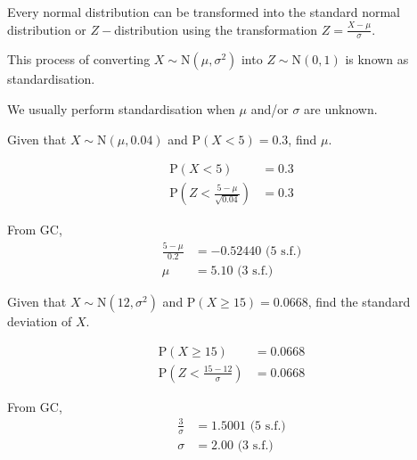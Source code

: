 \documentclass[11pt,a4paper]{book}
\begin{document}
Every normal distribution can be transformed into the standard normal
distribution or $Z-$distribution using the transformation ${\displaystyle Z=\frac{X-\mu}{\sigma}}$.

This process of converting $X\sim\text{N}\left(\mu,\sigma^{2}\right)$
into $Z\sim\text{N}\left(0,1\right)$ is known as standardisation.

We usually perform standardisation when $\mu$ and/or $\sigma$ are
unknown.

\begin{example}

Given that $X\sim\text{N}\left(\mu,0.04\right)$ and $\text{P}\left(X<5\right)=0.3$,
find $\mu$.

\Solution

\begin{align*}
\text{P}\left(X<5\right) & =0.3\\
\text{P}\left(Z<\frac{5-\mu}{\sqrt{0.04}}\right) & =0.3
\end{align*}

From GC,
\begin{align*}
\frac{5-\mu}{0.2} & =-0.52440\text{ (5 s.f.)}\\
\mu & =5.10\text{ (3 s.f.)}
\end{align*}

\end{example}

\begin{example}

Given that $X\sim\text{N}\left(12,\sigma^{2}\right)$ and $\text{P}\left(X\geq15\right)=0.0668$,
find the standard deviation of $X$.

\Solution

\begin{align*}
\text{P}\left(X\geq15\right) & =0.0668\\
\text{P}\left(Z<\frac{15-12}{\sigma}\right) & =0.0668
\end{align*}

From GC,
\begin{align*}
\frac{3}{\sigma} & =1.5001\text{ (5 s.f.)}\\
\sigma & =2.00\text{ (3 s.f.)}
\end{align*}

\end{example}

\newpage
\end{document}
